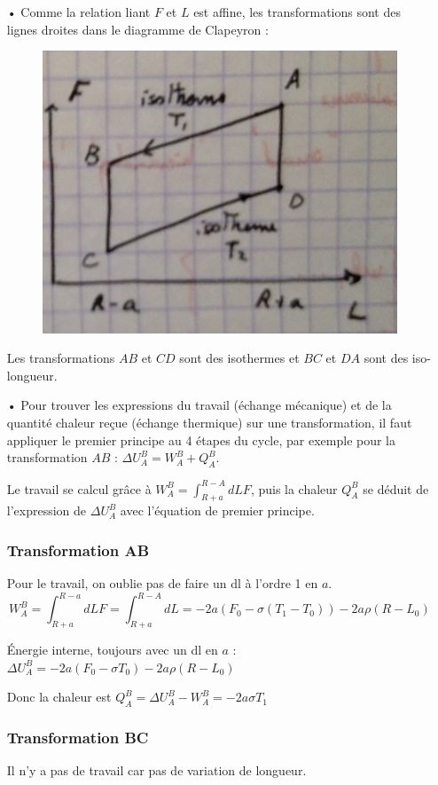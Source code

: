 \documentclass{report}
\begin{document}
\begin{itemize}
	\item[•] Comme la relation liant $F$ et $L$ est affine, les transformations sont des lignes droites dans le diagramme de Clapeyron :

\begin{figure}[!h]
\centering
\includegraphics[width=0.4\linewidth]{thermo5.png}
\end{figure}	
Les transformations $AB$ et $CD$ sont des isothermes et $BC$ et $DA$ sont des iso-longueur.

\item[•] Pour trouver les expressions du travail (échange mécanique) et de la quantité chaleur reçue (échange thermique) sur une transformation, il faut appliquer le premier principe au 4 étapes du cycle, par exemple pour la transformation $AB$ : $\Delta U_A^B = W_A^B + Q_A^B$. 

Le travail se calcul grâce à $W_A^B=\int_{R+a}^{R-A}dL F$, puis la chaleur $Q_A^B$ se déduit de l'expression de $\Delta U_A^B$ avec l'équation de premier principe. 

\subsubsection*{Transformation AB}
Pour le travail, on oublie pas de faire un dl à l'ordre 1 en $a$.
\begin{equation}
W_A^B=\int_{R+a}^{R-a}dL F = \int_{R+a}^{R-A}dL =-2a\left( F_0-\sigma(T_1-T_0)  \right) -2a\rho(R-L_0)
\end{equation}

Énergie interne, toujours avec un dl en $a$ : 
$\Delta U_A^B = -2a(F_0-\sigma T_0)-2a\rho(R-L_0)$

Donc la chaleur est $Q_A^B=\Delta U_A^B-W_A^B=-2a\sigma T_1$

\subsubsection*{Transformation BC}
Il n'y a pas de travail car pas de variation de longueur.


\end{itemize}
\end{document}
